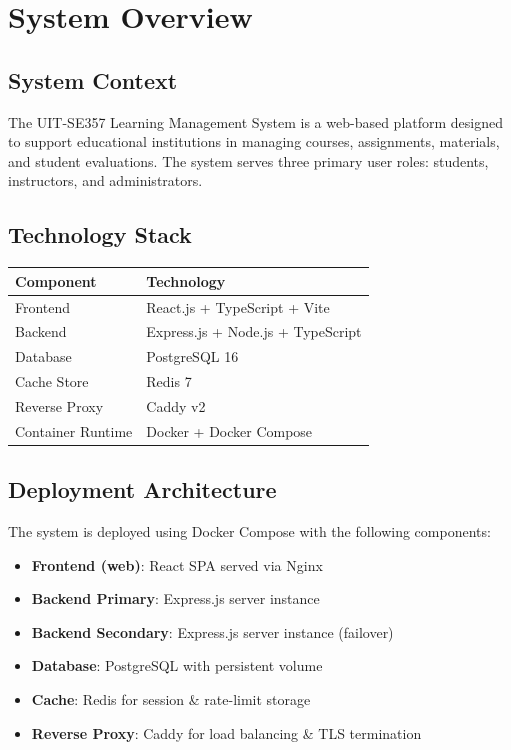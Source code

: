 \documentclass[12pt,oneside,a4paper]{article}
\begin{document}
\newpage

\section{System Overview}

\subsection{System Context}
The UIT-SE357 Learning Management System is a web-based platform designed to support educational institutions in managing courses, assignments, materials, and student evaluations. The system serves three primary user roles: students, instructors, and administrators.

\subsection{Technology Stack}

\begin{tabularx}{\textwidth}{|l|X|}
    \hline
    \textbf{Component} & \textbf{Technology} \\
    \hline
    Frontend & React.js + TypeScript + Vite \\
    Backend & Express.js + Node.js + TypeScript \\
    Database & PostgreSQL 16 \\
    Cache Store & Redis 7 \\
    Reverse Proxy & Caddy v2 \\
    Container Runtime & Docker + Docker Compose \\
    \hline
\end{tabularx}

\subsection{Deployment Architecture}
The system is deployed using Docker Compose with the following components:
\begin{itemize}
    \item \textbf{Frontend (web)}: React SPA served via Nginx
    \item \textbf{Backend Primary}: Express.js server instance
    \item \textbf{Backend Secondary}: Express.js server instance (failover)
    \item \textbf{Database}: PostgreSQL with persistent volume
    \item \textbf{Cache}: Redis for session \& rate-limit storage
    \item \textbf{Reverse Proxy}: Caddy for load balancing \& TLS termination
\end{itemize}
\end{document}
